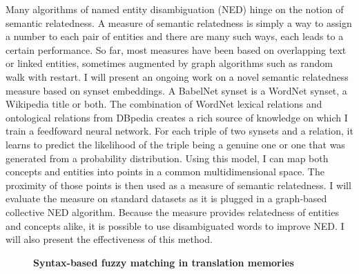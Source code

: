 \documentclass[10pt, a4paper, twopage, headinclude, footinclude, BCOR5mm]{book}
\begin{document}
\begin{table}[t!]
\end{table} 
\noindent
Many algorithms of named entity disambiguation (NED) hinge on the notion of semantic relatedness. A measure of semantic relatedness is simply a way to assign a number to each pair of entities and there are many such ways, each leads to a certain performance. So far, most measures have been based on overlapping text or  linked entities, sometimes augmented by graph algorithms such as random walk with restart. I will present an ongoing work on a novel semantic relatedness measure based on synset embeddings.  A BabelNet synset is a WordNet synset, a Wikipedia title or both. The combination of WordNet lexical relations and ontological relations from DBpedia creates a rich source of knowledge on which I train a feedfoward neural network. For each triple of two synsets and a relation, it learns to predict the likelihood of the triple being a genuine one or one that was generated from a probability distribution. Using this model, I can map both concepts and entities into points in a common multidimensional space. The proximity of those points is then used as a measure of semantic relatedness.  I will evaluate the measure on standard datasets as it is plugged in a graph-based collective NED algorithm. Because the measure provides relatedness of entities and concepts alike, it is possible to use disambiguated words to improve NED. I will also present the effectiveness of this method.  

\newpage

\begin{figure}[t!]
\centering
\large\textbf{Syntax-based fuzzy matching in translation memories}
\vspace*{0.5cm}
\end{figure}
\end{document}
